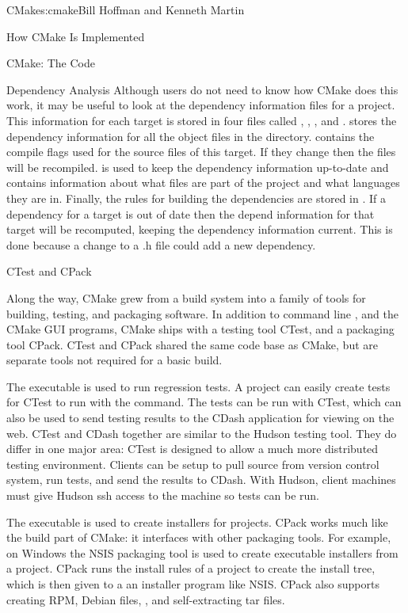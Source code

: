 \begin{aosachapter}{CMake}{s:cmake}{Bill Hoffman and Kenneth Martin}
\begin{aosasect1}{How CMake Is Implemented}
\begin{aosasect2}{CMake: The Code}
\begin{aosasect3}{Dependency Analysis}
Although users do not need to know how CMake does this work, it may be
useful to look at the dependency information files for a project. This
information for each target is stored in four files called
, , , and
.   stores the dependency
information for all the object files in the directory.
 contains the compile flags used for the source files
of this target. If they change then the files will be recompiled.
 is used to keep the dependency information
up-to-date and contains information about what files are part of the
project and what languages they are in. Finally, the rules for
building the dependencies are stored in . If a
dependency for a target is out of date then the depend information
for that target will be recomputed, keeping the dependency information
current. This is done because a change to a .h file could add a new
dependency.

\end{aosasect3}

\begin{aosasect3}{CTest and CPack}

Along the way, CMake grew from a build system into
a family of tools for building, testing, and packaging
software. In addition to command line , and the CMake GUI
programs, CMake ships with a testing tool CTest, and a packaging tool
CPack. CTest and CPack shared the same code base as CMake, but are
separate tools not required for a basic build.

The  executable is used to run regression tests. A project
can easily create tests for CTest to run with the 
command. The tests can be run with CTest, which can also be used to
send testing results to the CDash application for viewing on the web.
CTest and CDash together are similar to the Hudson testing tool. They
do differ in one major area: CTest is designed to allow a much more
distributed testing environment.  Clients can be setup to pull source
from version control system, run tests, and send the results to
CDash. With Hudson, client machines must give Hudson ssh access to the
machine so tests can be run.

The  executable is used to create installers for
projects. CPack works much like the build part of CMake: it interfaces
with other packaging tools. For example, on Windows the NSIS packaging
tool is used to create executable installers from a project. CPack
runs the install rules of a project to create the install tree, which
is then given to a an installer program like NSIS\@.  CPack also
supports creating RPM, Debian  files, ,
 and self-extracting tar files.


\end{aosasect3}
\end{aosasect2}
\end{aosasect1}
\end{aosachapter}
